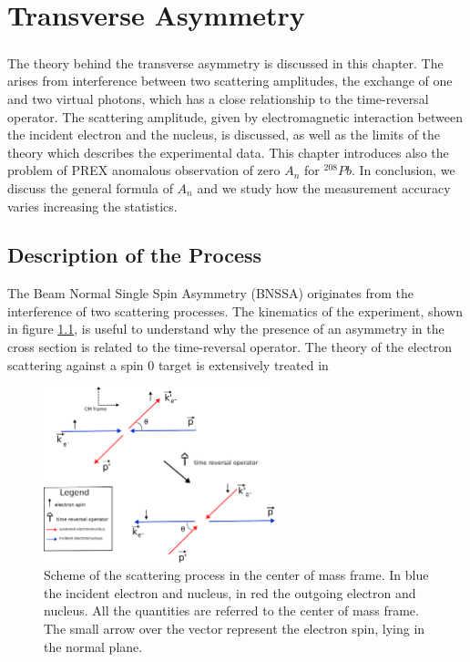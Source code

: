 
\chapter{Transverse Asymmetry} \label{transv}

\paragraph{}
The theory behind the transverse asymmetry is discussed in this chapter. The \transv arises from interference between two scattering amplitudes, the exchange of one and two virtual photons, which has a close relationship to the time-reversal operator. The scattering amplitude, given by electromagnetic interaction between the incident electron and the nucleus, is discussed, as well as the limits of the theory which describes the experimental data. This chapter introduces also the problem of PREX anomalous observation of zero $A_{n}$ for $^{208}Pb$. In conclusion, we discuss the general formula of $A_{n}$ and we study how the measurement accuracy varies increasing the statistics. 

\section{Description of the Process}

The Beam Normal Single Spin Asymmetry (BNSSA) originates from the interference of two scattering processes. The kinematics of the experiment, shown in figure \ref{fig:ScatteringSchemeFinal}, is useful to understand why the presence of an asymmetry in the cross section is related to the time-reversal operator. The theory of the electron scattering against a spin $0$ target is extensively treated in \cite{Gorchtein_2008}

\begin{figure}[hbtp] 
\centering
\includegraphics[width = 0.6\textwidth]{Transverse/scattering.pdf}
\caption{Scheme of the scattering process in the center of mass frame. In blue the incident electron and nucleus, in red the outgoing electron and nucleus. All the quantities are referred to the center of mass frame. The small arrow over the vector represent the electron spin, lying in the normal plane.}
\label{fig:ScatteringSchemeFinal}
\end{figure}

